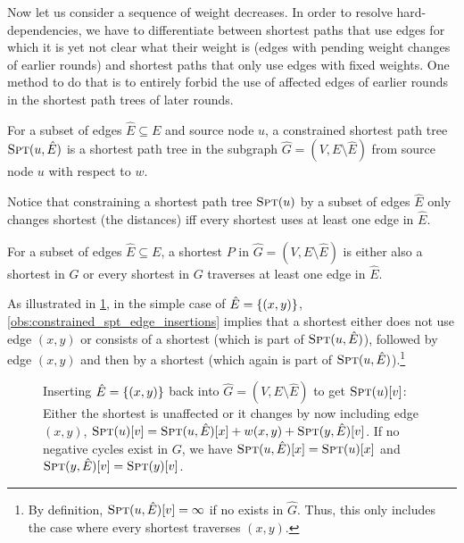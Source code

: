 Now let us consider a sequence of weight decreases.
In order to resolve hard-dependencies, we have to differentiate between shortest paths that use edges for which it is yet not clear what their weight is (\ie edges with pending weight changes of earlier rounds) and shortest paths that only use edges with fixed weights.
One method to do that is to entirely forbid the use of affected edges of earlier rounds in the shortest path trees of later rounds.

\begin{definition}
    For a subset of edges $\hat{E} \subseteq E$ and source node $u$, a constrained shortest path tree $\textsc{Spt}(u, \hat{E})$ is a shortest path tree in the subgraph $\hat{G} = (V, E \setminus \hat{E})$ from source node $u$ with respect to $w$.
\end{definition}

Notice that constraining a shortest path tree $\textsc{Spt}(u)$ by a subset of edges $\hat{E}$ only changes shortest  (the distances) iff every shortest  uses at least one edge in $\hat{E}$.

\begin{observation}\label{obs:constrained_spt_edge_insertions}
    For a subset of edges $\hat{E} \subseteq E$, a shortest  $P$ in $\hat{G} = (V, E \setminus \hat{E})$ is either also a shortest  in $G$ or every shortest  in $G$ traverses at least one edge in $\hat{E}$.
\end{observation}

\noindent As illustrated in \cref{fig:constrained_edge_insertion}, in the simple case of $\hat{E} = \left\{(x, y)\right\}$, \cref{obs:constrained_spt_edge_insertions} implies that a shortest  either does not use edge $(x, y)$ or consists of a shortest  (which is part of $\textsc{Spt}(u, \hat{E})$), followed by edge $(x, y)$ and then by a shortest  (which again is part of $\textsc{Spt}(u, \hat{E})$).\footnote{
    By definition, $\textsc{Spt}(u, \hat{E})[v] = \infty$ if no  exists in $\hat{G}$.
    Thus, this only includes the case where every shortest  traverses $(x, y)$.
}

\begin{figure}[!htb]
    \centering
    
    \caption{
        Inserting $\hat{E} = \left\{(x, y)\right\}$ back into $\hat{G} = (V, E \setminus \hat{E})$ to get $\textsc{Spt}(u)[v]$:
        Either the shortest  is unaffected or it changes by now including edge $(x, y)$, \ie $\textsc{Spt}(u)[v] = \textsc{Spt}(u, \hat{E})[x] + w(x, y) + \textsc{Spt}(y, \hat{E})[v]$.
        If no negative cycles exist in $G$, we have $\textsc{Spt}(u, \hat{E})[x] = \textsc{Spt}(u)[x]$ and $\textsc{Spt}(y, \hat{E})[v] = \textsc{Spt}(y)[v]$.
    }
    \label{fig:constrained_edge_insertion}
\end{figure}

